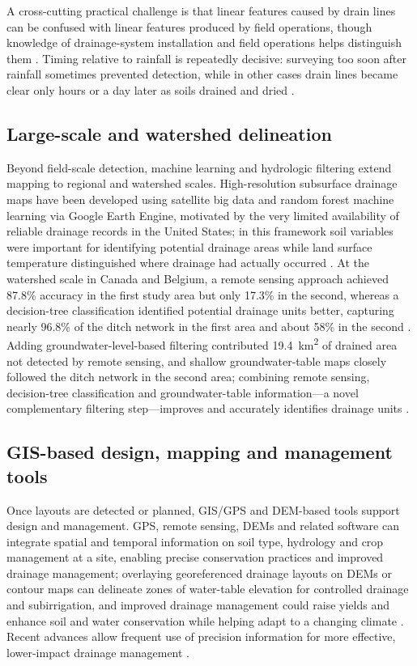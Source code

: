 \documentclass[11pt]{article}
\begin{document}
A cross-cutting practical challenge is that linear features caused by drain lines can be confused with linear features produced by field operations, though knowledge of drainage-system installation and field operations helps distinguish them \parencite{Allred2020}. Timing relative to rainfall is repeatedly decisive: surveying too soon after rainfall sometimes prevented detection, while in other cases drain lines became clear only hours or a day later as soils drained and dried \parencite{Allred2020}.

\subsection{Large-scale and watershed delineation}

Beyond field-scale detection, machine learning and hydrologic filtering extend mapping to regional and watershed scales. High-resolution subsurface drainage maps have been developed using satellite big data and random forest machine learning via Google Earth Engine, motivated by the very limited availability of reliable drainage records in the United States; in this framework soil variables were important for identifying potential drainage areas while land surface temperature distinguished where drainage had actually occurred \parencite{Cho2019}. At the watershed scale in Canada and Belgium, a remote sensing approach achieved 87.8\% accuracy in the first study area but only 17.3\% in the second, whereas a decision-tree classification identified potential drainage units better, capturing nearly 96.8\% of the ditch network in the first area and about 58\% in the second \parencite{Yimer2023}. Adding groundwater-level-based filtering contributed 19.4~km\textsuperscript{2} of drained area not detected by remote sensing, and shallow groundwater-table maps closely followed the ditch network in the second area; combining remote sensing, decision-tree classification and groundwater-table information---a novel complementary filtering step---improves and accurately identifies drainage units \parencite{Yimer2023}.

\subsection{GIS-based design, mapping and management tools}

Once layouts are detected or planned, GIS/GPS and DEM-based tools support design and management. GPS, remote sensing, DEMs and related software can integrate spatial and temporal information on soil type, hydrology and crop management at a site, enabling precise conservation practices and improved drainage management; overlaying georeferenced drainage layouts on DEMs or contour maps can delineate zones of water-table elevation for controlled drainage and subirrigation, and improved drainage management could raise yields and enhance soil and water conservation while helping adapt to a changing climate \parencite{Shedekar2018}. Recent advances allow frequent use of precision information for more effective, lower-impact drainage management \parencite{Shedekar2018}.
\end{document}
